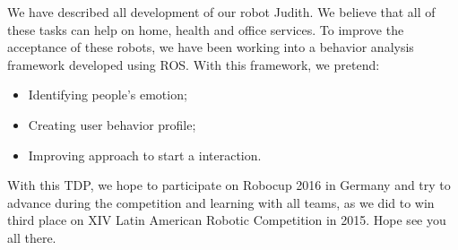 We have described all development of our robot Judith. We believe that all of these tasks can help on home, health and office services. To improve the acceptance of these robots, we have been working into a behavior analysis framework developed using ROS. With this framework, we pretend:
\begin{itemize}
    \item Identifying people's emotion;
    \item Creating user behavior profile;
    \item Improving approach to start a interaction.
\end{itemize}
With this TDP, we hope to participate on Robocup 2016 in Germany and try to advance during the competition and learning with all teams, as we did to win third place on XIV Latin American Robotic Competition in 2015. Hope see you all there.